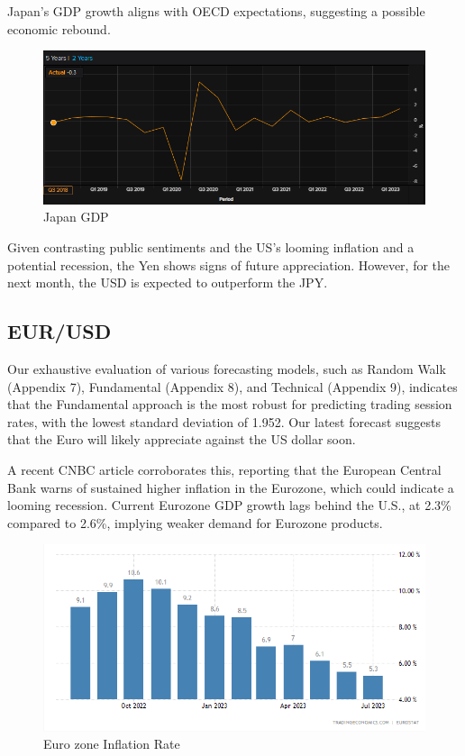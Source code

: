 \documentclass{article}
\let\Oldsubsection\subsection
\renewcommand{\subsection}{\FloatBarrier\Oldsubsection}
\begin{document}
\noindent Japan's GDP growth aligns with OECD expectations, suggesting a possible economic rebound.

\begin{figure}[h!]
    \centering
    \includegraphics[scale=0.5]{graphs/JPY-GDP.png}
    \caption{Japan GDP}
    \label{Japan GDP}
\end{figure}

\noindent Given contrasting public sentiments and the US's looming inflation and a potential recession, the Yen shows signs of future appreciation. However, for the next month, the USD is expected to outperform the JPY.

\subsection*{EUR/USD}
Our exhaustive evaluation of various forecasting models, such as Random Walk (Appendix 7), Fundamental (Appendix 8), and Technical (Appendix 9), indicates that the Fundamental approach is the most robust for predicting trading session rates, with the lowest standard deviation of 1.952. Our latest forecast suggests that the Euro will likely appreciate against the US dollar soon. 

\noindent A recent CNBC article corroborates this, reporting that the European Central Bank warns of sustained higher inflation in the Eurozone, which could indicate a looming recession. Current Eurozone GDP growth lags behind the U.S., at 2.3\% compared to 2.6\%, implying weaker demand for Eurozone products. 

\begin{figure}[h!]
    \centering
    \includegraphics[scale=0.5]{graphs/EUR- Inflation Historical.png}
    \caption{Euro zone Inflation Rate}
    \label{Euro zone Inflation Rate}
\end{figure}
\end{document}
